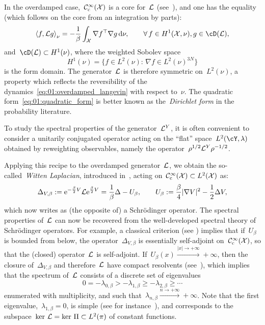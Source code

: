 In the overdamped case,~$\mathcal{C}^\infty_{\mathrm{c}}(\mathcal{X})$ is a core for~$\mathcal{L}$ (see~\cite[Theorem 8.1.26]{LB06}), and one has the equality (which follows on the core from an integration by parts):
\begin{equation}
    \label{eq:01:quadratic_form}
    \left\langle f,\cL g\right\rangle_\nu = -\frac1\beta\int_{\cX} \nabla f^\top\nabla g\,\d \nu,\qquad\forall\,f\in H^1(\cX,\nu),g\in \cD(\cL),
\end{equation}
and~$\cD(\cL)\subset H^1(\nu)$, where the weighted Sobolev space $${H^1(\nu)=\{f\in L^2(\nu):\,\nabla f\in L^2(\nu)^{3N}\}}$$ is the form domain.
The generator~$\mathcal{L}$ is therefore symmetric on~$L^2(\nu)$, a property which reflects the reversibility of the dynamics~\eqref{eq:01:overdamped_langevin} with respect to~$\nu$. The quadratic form~\eqref{eq:01:quadratic_form} is better known as the~\textit{Dirichlet form} in the probability literature.

To study the spectral properties of the generator~$\mathcal{L}^Y$, it is often convenient to consider a unitarily conjugated operator acting on the ``flat'' space~$L^2(\cY,\lambda)$ obtained by reweighting observables, namely the operator~$\rho^{1/2}\mathcal{L}^Y \rho^{-1/2}$.

Applying this recipe to the overdamped generator~$\mathcal{L}$, we obtain the so-called~\textit{Witten Laplacian}, introduced in~\cite{W82}, acting on~$\mathcal{C}^\infty_{\mathrm{c}}(\mathcal{X})\subset L^2(\mathcal{X})$ as:
\begin{equation}
    \label{eq:01:witten_laplacian}
    \Delta_{V,\beta}:=\mathrm{e}^{-\frac{\beta}{2}V}\mathcal{L}\mathrm{e}^{\frac{\beta}{2}V} = \frac1\beta\Delta - U_\beta,\qquad U_\beta:=\frac\beta{4}|\nabla V|^2 -\frac12 \Delta V,
\end{equation}
which now writes as (the opposite of) a Schr\"odinger operator. The spectral properties of~$\mathcal{L}$ can now be recovered from the well-developed spectral theory of Schr\"odinger operators.
For example, a classical criterion (see \cite[Theorem X.28]{RS75}) implies that if~$U_\beta$ is bounded from below, the operator~$\Delta_{V,\beta}$ is essentially self-adjoint on~$\mathcal{C}^\infty_{\mathrm{c}}(\mathcal{X})$, so that the (closed) operator~$\mathcal{L}$ is self-adjoint.
If~$U_\beta(x)\xrightarrow{|x|\to +\infty} +\infty$, then the closure of~$\Delta_{V,\beta}$ and therefore~$\mathcal{L}$ have compact resolvents (see~\cite[Theorem XIII.67]{RS78}), which implies that the spectrum of~$\mathcal{L}$ consists of a discrete set of eigenvalues
\begin{equation}
    \label{eq:01:spectrum_cL}
    0=-\lambda_{0,\beta}>-\lambda_{1,\beta} \geq -\lambda_{2,\beta}\geq\cdots
\end{equation}
enumerated with multiplicity, and such that~$\lambda_{n,\beta}\xrightarrow{n\to +\infty} +\infty$. Note that the first eigenvalue,~$\lambda_{1,\beta}=0$, is simple (see for instance~\cite[Theorem XIII.47]{RS78}), and corresponds to the subspace~$\ker\,\mathcal{L} = \ker\,\Pi \subset L^2(\pi)$ of constant functions.


